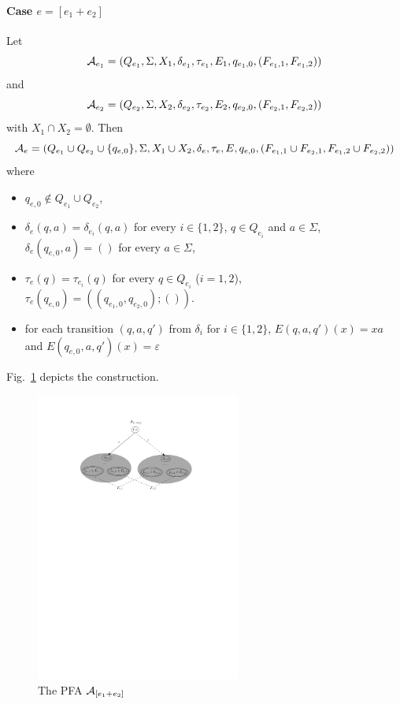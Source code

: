 \paragraph{Case $e = [e_1 + e_2]$} Let 
\[\mathcal{A}_{e_1} = (Q_{e_1}, \Sigma, X_1, \delta_{e_1}, \tau_{e_1}, E_1,  q_{e_1,0}, (F_{e_1,1}, F_{e_1,2}))\] and 
\[\mathcal{A}_{e_2} = (Q_{e_2}, \Sigma, X_2, \delta_{e_2}, \tau_{e_2}, E_2, q_{e_2,0}, (F_{e_2, 1}, F_{e_2,2}))\] 
with $X_1\cap X_2=\emptyset$. 
Then 
\[\mathcal{A}_e = (Q_{e_1} \cup Q_{e_2} \cup \{q_{e,0}\}, \Sigma, X_1\cup X_2, 
		\delta_e, \tau_e, E, q_{e,0}, (F_{e_1,1} \cup F_{e_2,1}, F_{e_1,2} \cup F_{e_2,2}))\] where  
		\begin{itemize}
			\item $q_{e,0}  \not \in Q_{e_1} \cup Q_{e_2}$, 
			\item $\delta_e(q, a) = \delta_{e_i}(q, a)$ for every $i \in \{1,2\}$, $q \in Q_{e_i}$ and $a \in \Sigma$, 
			$\delta_e(q_{e,0}, a)  = ()$ for every $a \in \Sigma$, 
			\item $\tau_e(q) = \tau_{e_i}(q)$ for every $q \in Q_{e_i}$ ($i =1,2$), $\tau_e(q_{e,0}) = ((q_{e_1,0},q_{e_2,0}); ())$.
			\item for each transition $(q, a, q')$ from $\delta_i$ for $i\in\{1,2\}$, $E(q,a,q')(x) =xa$ and $E(q_{e,0},a,q')(x) =\varepsilon$
		\end{itemize}
Fig.~\ref{fig-reg2pfa-1} depicts the construction.  	
		\begin{figure}[ht]
			\centering
			\includegraphics[width = 0.6\textwidth]{reg2pfa-1.pdf}
			\caption{The PFA $\mathcal{A}_{[e_1+e_2]}$}
			\label{fig-reg2pfa-1}
		\end{figure}  

